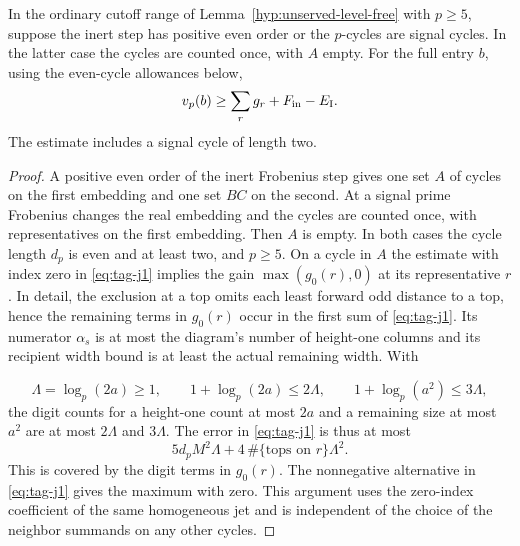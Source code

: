 \begin{proposition}\label{prop:unserved-even-entries}
In the ordinary cutoff range of Lemma~\ref{hyp:unserved-level-free} with \(p\ge5\), suppose the
inert step has positive even order or the \(p\)-cycles are signal
cycles. In the latter case the cycles are counted once, with \(A\)
empty. For the full entry \(b\), using the even-cycle allowances below,
\[
 v_p(b)\ge\sum_r g_r+F_{\rm in}-E_{\rm I}.
\]
The estimate includes a signal cycle of length two.
\end{proposition}

\begin{proof}

A positive even order of the inert Frobenius step gives one
set \(A\) of cycles on the first embedding and one set
\(BC\) on the second. At a signal prime Frobenius changes the
real embedding and the cycles are counted once, with
representatives on the first embedding. Then \(A\) is empty.
In both cases the cycle length \(d_p\) is even and at least
two, and \(p\ge5\). On a cycle in \(A\) the estimate with
index zero in \eqref{eq:tag-j1} implies the gain \(\max(g_0(r),0)\) at its
representative \(r\). In detail, the exclusion at a top
omits each least forward odd distance to a top, hence
the remaining terms in \(g_0(r)\) occur in the first sum of
\eqref{eq:tag-j1}. Its numerator \(\alpha_s\) is at most the diagram's
number of height-one columns and its recipient width
bound is at least the actual remaining width. With

\[
  \Lambda=\log_p(2a)\ge1,\qquad 1+\log_p(2a)\le 2\Lambda,\qquad 1+\log_p(a^2)\le3\Lambda,
\]
 the digit counts for a
height-one count at most \(2a\) and a remaining size at
most \(a^2\) are at most \(2\Lambda\) and \(3\Lambda\).
The error in \eqref{eq:tag-j1} is thus at most
\[
   5d_p M^2\Lambda+4\,\#\{\text{tops on }r\}\Lambda^2 .
\]
This is covered by the digit terms in \(g_0(r)\).
The nonnegative alternative in \eqref{eq:tag-j1} gives the maximum
with zero. This argument uses the zero-index coefficient
of the same homogeneous jet and is independent of the
choice of the neighbor summands on any other cycles.



\end{proof}
